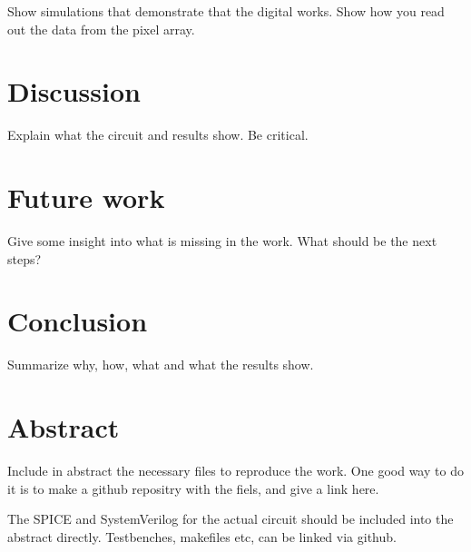 \documentclass[paper,10pt,a4paper]{IEEEtran}
\begin{document}
Show simulations that demonstrate that the digital works. Show how you read out the data from the pixel array.

\section{Discussion}
Explain what the circuit and results show. Be critical.

\section{Future work}
Give some insight into what is missing in the work. What should be the next steps?

\section{Conclusion}
Summarize why, how, what and what the results show.

\section{Abstract}
Include in abstract the necessary files to reproduce the work. One good way to
do it is to make a github repositry with the fiels, and give a link here.

The SPICE and SystemVerilog for the actual circuit should be included into the
abstract directly. Testbenches, makefiles etc, can be linked via github.
\end{document}
